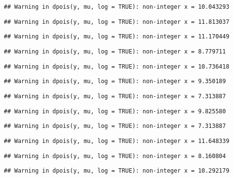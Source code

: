 \documentclass[
]{article}
\begin{document}
\begin{verbatim}
## Warning in dpois(y, mu, log = TRUE): non-integer x = 10.043293
\end{verbatim}

\begin{verbatim}
## Warning in dpois(y, mu, log = TRUE): non-integer x = 11.813037
\end{verbatim}

\begin{verbatim}
## Warning in dpois(y, mu, log = TRUE): non-integer x = 11.170449
\end{verbatim}

\begin{verbatim}
## Warning in dpois(y, mu, log = TRUE): non-integer x = 8.779711
\end{verbatim}

\begin{verbatim}
## Warning in dpois(y, mu, log = TRUE): non-integer x = 10.736418
\end{verbatim}

\begin{verbatim}
## Warning in dpois(y, mu, log = TRUE): non-integer x = 9.350189
\end{verbatim}

\begin{verbatim}
## Warning in dpois(y, mu, log = TRUE): non-integer x = 7.313887
\end{verbatim}

\begin{verbatim}
## Warning in dpois(y, mu, log = TRUE): non-integer x = 9.825580
\end{verbatim}

\begin{verbatim}
## Warning in dpois(y, mu, log = TRUE): non-integer x = 7.313887
\end{verbatim}

\begin{verbatim}
## Warning in dpois(y, mu, log = TRUE): non-integer x = 11.648339
\end{verbatim}

\begin{verbatim}
## Warning in dpois(y, mu, log = TRUE): non-integer x = 8.160804
\end{verbatim}

\begin{verbatim}
## Warning in dpois(y, mu, log = TRUE): non-integer x = 10.292179
\end{verbatim}
\end{document}
